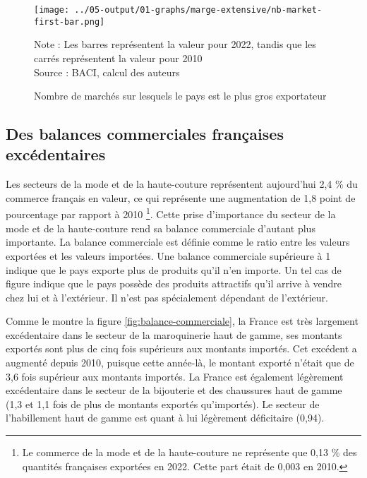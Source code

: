 \documentclass[french,10pt,a4paper]{article}
\begin{document}
\begin{figure}[!h]
  \centering  \texttt{[image: ../05-output/01-graphs/marge-extensive/nb-market-first-bar.png]}
  \captionsetup{justification=justified, singlelinecheck=false, font=small}
  \caption*{Note : Les barres représentent la valeur pour 2022, tandis que les carrés représentent la valeur pour 2010 \\
  Source : BACI, calcul des auteurs}
  \captionsetup{justification=centering, singlelinecheck=true, font=normalsize}
  \caption{Nombre de marchés sur lesquels le pays est le plus gros exportateur}
  \label{fig:nb-market-first-bar}
\end{figure}


\subsection{Des balances commerciales françaises excédentaires}
Les secteurs de la mode et de la haute-couture représentent aujourd'hui 2,4 \% du commerce français en valeur, ce qui représente une augmentation de 1,8 point de pourcentage par rapport à 2010 \footnote{Le commerce de la mode et de la haute-couture ne représente que 0,13 \% des quantités françaises exportées en 2022. Cette part était de 0,003 en 2010.}. Cette prise d'importance du secteur de la mode et de la haute-couture rend sa balance commerciale d'autant plus importante. La balance commerciale est définie comme le ratio entre les valeurs exportées et les valeurs importées. Une balance commerciale supérieure à 1 indique que le pays exporte plus de produits qu'il n'en importe. Un tel cas de figure indique que le pays possède des produits attractifs qu'il arrive à vendre chez lui et à l'extérieur. Il n'est pas spécialement dépendant de l'extérieur.

\bigskip

Comme le montre la figure \ref{fig:balance-commerciale}, la France est très largement excédentaire dans le secteur de la maroquinerie haut de gamme, ses montants exportés sont plus de cinq fois supérieurs aux montants importés. Cet excédent a augmenté depuis 2010, puisque cette année-là, le montant exporté n'était que de 3,6 fois supérieur aux montants importés. La France est également légèrement excédentaire dans le secteur de la bijouterie et des chaussures haut de gamme (1,3 et 1,1 fois de plus de montants exportés qu'importés). Le secteur de l'habillement haut de gamme est quant à lui légèrement déficitaire (0,94).
\end{document}
